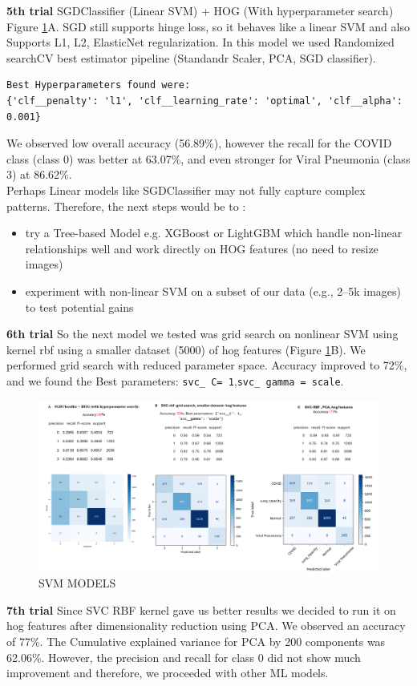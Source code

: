 \documentclass{article}
\begin{document}
\textbf{5th trial }SGDClassifier (Linear SVM) + HOG (With hyperparameter search) Figure \ref{fig:SVM_MODELS}A. SGD still supports hinge loss, so it behaves like a linear SVM and also Supports L1, L2, ElasticNet regularization. In this model we used Randomized searchCV best estimator pipeline (Standandr Scaler, PCA, SGD classifier). \begin{verbatim}
Best Hyperparameters found were:
{'clf__penalty': 'l1', 'clf__learning_rate': 'optimal', 'clf__alpha': 0.001}
\end{verbatim}
We observed low overall accuracy (56.89\%), however the recall for the COVID class (class 0) was better at 63.07\%, and even stronger for Viral Pneumonia (class 3) at 86.62\%.\\
Perhaps Linear models like SGDClassifier may not fully capture complex patterns.
Therefore, the next steps would be to :
\begin{itemize}
    \item try a Tree-based Model e.g. XGBoost or LightGBM which handle non-linear relationships well and work directly on HOG features (no need to resize images)
    \item experiment with non-linear SVM on a subset of our data (e.g., 2–5k images) to test potential gains
\end{itemize}
\textbf{6th trial } So the next model we tested was grid search on nonlinear SVM using kernel rbf using a smaller dataset (5000) of hog features (Figure \ref{fig:SVM_MODELS}B). We performed grid search with reduced parameter space.  Accuracy improved to 72\%, and we found the Best parameters: \texttt{svc\_ C= 1},\texttt {svc\_ gamma = scale}.
\\
\begin{figure}[htb!] %
    \centering
    \includegraphics[width=1.0\linewidth]{svm ABC.png}
    \caption{SVM MODELS}
    \label{fig:SVM_MODELS}
\end{figure}
\textbf{7th trial }Since SVC\- RBF kernel gave us better results we decided to run it on hog features after dimensionality reduction using PCA. We observed an accuracy of 77\%. The Cumulative explained variance for PCA by 200 components was 62.06\%. However, the precision and recall for class 0 did not show much improvement and therefore, we proceeded with other ML models.\\
\end{document}
